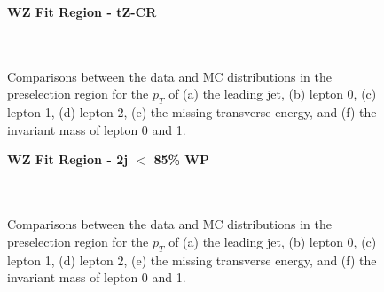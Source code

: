 \begin{figure}[h]
    \centering
    \textbf{WZ Fit Region - tZ-CR}\\
    \\
    \\
    \caption{Comparisons between the data and MC distributions in the preselection region for the $p_T$ of (a) the leading jet, (b) lepton 0, (c) lepton 1, (d) lepton 2, (e) the missing transverse energy, and (f) the invariant mass of lepton 0 and 1.}
    \label{kin:tZ_CR_1j}
\end{figure}

\begin{figure}[h]
    \centering
    \textbf{WZ Fit Region - 2j $<$ 85\% WP}\\
    \\
    \\
    \caption{Comparisons between the data and MC distributions in the preselection region for the $p_T$ of (a) the leading jet, (b) lepton 0, (c) lepton 1, (d) lepton 2, (e) the missing transverse energy, and (f) the invariant mass of lepton 0 and 1.}
    \label{kin:WP_2j_not85}
\end{figure}


